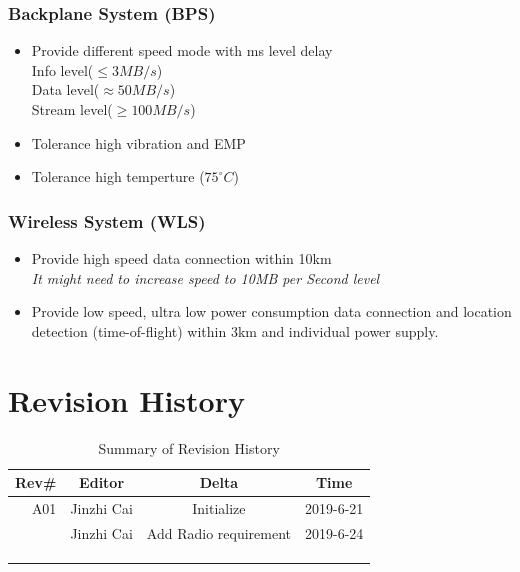 \documentclass[12pt,article]{memoir}
\begin{document}
\subsection{Backplane System (BPS)}
\begin{itemize}
\item Provide different speed mode with ms level delay \\
Info level($\leq 3MB/s$)\\
Data level($\approx 50MB/s$)\\
Stream level($\geq 100MB/s$)
\item Tolerance high vibration and EMP
\item Tolerance high temperture (\leq $75^{\circ}C$)
\end{itemize}
\subsection{Wireless System (WLS)}
\begin{itemize}
\item Provide high speed data connection within 10km\\
	\textit{It might need to increase speed to 10MB per Second level}
\item Provide low speed, ultra low power consumption data connection and location detection (time-of-flight) within 3km and individual power supply.
\end{itemize}
\chapter{Revision History}
\begin{table}[H]
	\centering
	\begin{tabu}{r || c | c | c }
		Rev\# & Editor & Delta & Time\\ \hline
		A01 & Jinzhi Cai & Initialize  & 2019-6-21 \\
		 & Jinzhi Cai & Add Radio requirement & 2019-6-24 \\ \hline
		 & & & \\
		 & & & \\
		 & & & \\
	\end{tabu}
	\caption{Summary of Revision History}
	\label{tab:edatools}
\end{table}

\end{document}
